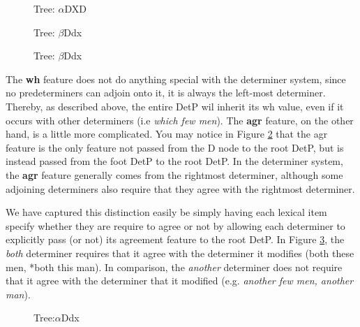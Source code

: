 
\begin{figure}[ht]
\centering
\mbox{}
\caption{Tree:  $\alpha$DXD}
\label{DXD} 
\end{figure}


\begin{figure}[ht]
\centering
\mbox{}
\caption{\label{Ddx-features} Tree:  $\beta$Ddx}
\end{figure}



\begin{figure}[ht]
\centering
\mbox{}
\caption{ \label{Ddx_both} Tree:  $\beta$Ddx}
\end{figure}


The {\bf wh} feature does not do anything special with the determiner system, since
no predeterminers can adjoin onto it, it is always the left-most determiner.
Thereby, as described above, the entire DetP wil inherit its wh value, even if
it occurs with other determiners (i.e {\it which few men}).  The {\bf agr} feature, on
the other hand, is a little more complicated.  You may notice in Figure \ref{Ddx-features} that the agr feature is the only feature not passed from
the D node to the root DetP, but is instead passed from the foot DetP to the
root DetP.  In the determiner system, the {\bf agr} feature generally comes from the
rightmost determiner, although some adjoining determiners also require that
they agree with the rightmost determiner.  


We have captured this distinction easily be simply having each
lexical item specify whether they are require to agree or not by allowing each
determiner to explicitly pass (or not) its agreement feature to the root DetP.
In Figure \ref{Ddx_both}, the {\it both} determiner requires that it
agree with the determiner it modifies (both these men, *both this man).  In
comparison, the {\it another} determiner does not require that it agree with the
determiner that it modified (e.g. {\it another few men, another man}).  


\begin{figure}[ht]
\centering
\mbox{}
\caption{Tree:$\alpha$Ddx}
\label{Ddx}
\end{figure}

